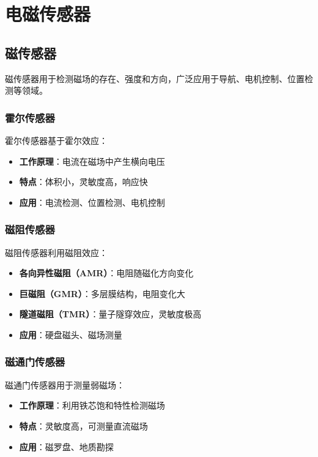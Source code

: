 \documentclass[12pt,UTF8]{ctexbook}
\begin{document}
\chapter{电磁传感器}

\section{磁传感器}

磁传感器用于检测磁场的存在、强度和方向，广泛应用于导航、电机控制、位置检测等领域。

\subsection{霍尔传感器}

霍尔传感器基于霍尔效应：

\begin{itemize}[leftmargin=2cm]
	\item \textbf{工作原理}：电流在磁场中产生横向电压
	\item \textbf{特点}：体积小，灵敏度高，响应快
	\item \textbf{应用}：电流检测、位置检测、电机控制
\end{itemize}

\subsection{磁阻传感器}

磁阻传感器利用磁阻效应：

\begin{itemize}[leftmargin=2cm]
	\item \textbf{各向异性磁阻（AMR）}：电阻随磁化方向变化
	\item \textbf{巨磁阻（GMR）}：多层膜结构，电阻变化大
	\item \textbf{隧道磁阻（TMR）}：量子隧穿效应，灵敏度极高
	\item \textbf{应用}：硬盘磁头、磁场测量
\end{itemize}

\subsection{磁通门传感器}

磁通门传感器用于测量弱磁场：

\begin{itemize}[leftmargin=2cm]
	\item \textbf{工作原理}：利用铁芯饱和特性检测磁场
	\item \textbf{特点}：灵敏度高，可测量直流磁场
	\item \textbf{应用}：磁罗盘、地质勘探
\end{itemize}
\end{document}
